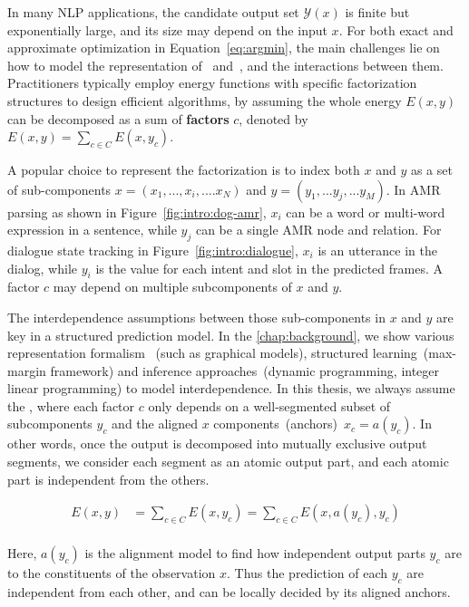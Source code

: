 In many NLP applications, the candidate output set $\mathcal{Y}(x)$ is
finite but exponentially large, and its size may depend on the input
$x$. For both exact and approximate optimization in
Equation~\ref{eq:argmin}, the main challenges lie on how to model the
representation of \IN~and~\OUT, and the interactions between
them. Practitioners typically employ energy functions with specific
factorization structures to design efficient algorithms, by assuming
the whole energy $E(x, y)$ can be decomposed as a sum of
\textbf{factors} $c$, denoted by $E(x, y) =\sum_{c \in C} E(x, y_{c})$.

A popular choice to represent the factorization is to index both $x$
and $y$ as a set of sub-components $x=(x_{1},..., x_{i},.... x_{N})$
and $y=(y_{1},...y_{j},...y_{M})$. In AMR parsing as shown in
Figure~\ref{fig:intro:dog-amr}, $x_{i}$ can be a word or multi-word
expression in a sentence, while $y_{j}$ can be a single AMR node and
relation.  For dialogue state tracking in
Figure~\ref{fig:intro:dialogue}, $x_{i}$ is an utterance in the
dialog, while $y_{i}$ is the value for each intent and slot in the
predicted frames. A factor $c$ may depend on multiple subcomponents
of $x$ and $y$.

The interdependence assumptions between those sub-components in $x$
and $y$ are key in a structured prediction model. In the
\autoref{chap:background}, we show various representation formalism
~(such as graphical models), structured learning~(max-margin
framework) and inference approaches~(dynamic programming, integer
linear programming) to model interdependence. In this thesis, we
always assume the , where each factor
$c$ only depends on a well-segmented subset of subcomponents $y_{c}$
and the aligned $x$ components~(anchors)~$x_{c}=a(y_{c})$. In other
words, once the output is decomposed into mutually exclusive output
segments, we consider each segment as an atomic output part, and each
atomic part is independent from the others.

\begin{equation}
    \label{eq:independent-factor}
    \begin{split}
    E(x, y) & =\sum_{c \in C} E(x, y_{c}) = \sum_{c \in C}E(x, a(y_{c}), y_{c})  \\
    \end{split}
\end{equation}

Here, $a(y_{c})$ is the alignment model to find how independent output
parts $y_{c}$ are  to the constituents of the observation
$x$. Thus the prediction of each $y_{c}$ are independent from each
other, and can be locally decided by its aligned anchors.

